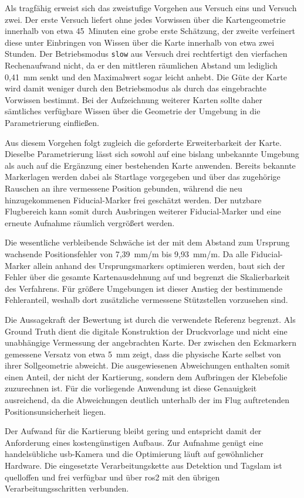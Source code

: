 Als tragfähig erweist sich das zweistufige Vorgehen aus Versuch eins und Versuch zwei.
Der erste Versuch liefert ohne jedes Vorwissen über die Kartengeometrie innerhalb von etwa 45~Minuten eine grobe erste Schätzung, der zweite verfeinert diese unter Einbringen von Wissen über die Karte innerhalb von etwa zwei Stunden.
Der Betriebsmodus \texttt{slow} aus Versuch drei rechtfertigt den vierfachen Rechenaufwand nicht, da er den mittleren räumlichen Abstand um lediglich 0,41~mm senkt und den Maximalwert sogar leicht anhebt.
Die Güte der Karte wird damit weniger durch den Betriebsmodus als durch das eingebrachte Vorwissen bestimmt.
Bei der Aufzeichnung weiterer Karten sollte daher sämtliches verfügbare Wissen über die Geometrie der Umgebung in die Parametrierung einfließen.

Aus diesem Vorgehen folgt zugleich die geforderte Erweiterbarkeit der Karte.
Dieselbe Parametrierung lässt sich sowohl auf eine bislang unbekannte Umgebung als auch auf die Ergänzung einer bestehenden Karte anwenden.
Bereits bekannte Markerlagen werden dabei als Startlage vorgegeben und über das zugehörige Rauschen an ihre vermessene Position gebunden, während die neu hinzugekommenen Fiducial-Marker frei geschätzt werden.
Der nutzbare Flugbereich kann somit durch Ausbringen weiterer Fiducial-Marker und eine erneute Aufnahme räumlich vergrößert werden.

Die wesentliche verbleibende Schwäche ist der mit dem Abstand zum Ursprung wachsende Positionsfehler von 7,39~mm/m bis 9,93~mm/m.
Da alle Fiducial-Marker allein anhand des Ursprungsmarkers optimieren werden, baut sich der Fehler über die gesamte Kartenausdehnung auf und begrenzt die Skalierbarkeit des Verfahrens.
Für größere Umgebungen ist dieser Anstieg der bestimmende Fehleranteil, weshalb dort zusätzliche vermessene Stützstellen vorzusehen sind.

Die Aussagekraft der Bewertung ist durch die verwendete Referenz begrenzt.
Als Ground Truth dient die digitale Konstruktion der Druckvorlage und nicht eine unabhängige Vermessung der angebrachten Karte.
Der zwischen den Eckmarkern gemessene Versatz von etwa 5~mm zeigt, dass die physische Karte selbst von ihrer Sollgeometrie abweicht.
Die ausgewiesenen Abweichungen enthalten somit einen Anteil, der nicht der Kartierung, sondern dem Aufbringen der Klebefolie zuzurechnen ist.
Für die vorliegende Anwendung ist diese Genauigkeit ausreichend, da die Abweichungen deutlich unterhalb der im Flug auftretenden Positionsunsicherheit liegen.

Der Aufwand für die Kartierung bleibt gering und entspricht damit der Anforderung eines kostengünstigen Aufbaus.
Zur Aufnahme genügt eine handelsübliche \gls{usb}-Kamera und die Optimierung läuft auf gewöhnlicher Hardware.
Die eingesetzte Verarbeitungskette aus Detektion und Tag\gls{slam} ist quelloffen und frei verfügbar und über \gls{ros2} mit den übrigen Verarbeitungsschritten verbunden.

